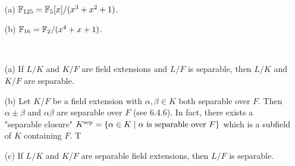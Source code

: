 \documentclass[11pt]{book}
\theoremstyle{definition}   \newtheorem{defn}[counter]{Definition} %
\newcommand{\vs}{\vspace{8pt}}   \newcommand{\hs}{\hspace{8pt}}
\numberwithin{counter}{chapter}
\begin{document}
\vs

\begin{example}\ 
\begin{enumerate}
\item[(a)] $\mathbb{F}_{125} = \mathbb{F}_5[x]/(x^3+x^2+1)$. 
\item[(b)] $\mathbb{F}_{16} = \mathbb{F}_2/(x^4+x+1)$. 
\end{enumerate}
\end{example}

\vs

\begin{remark}\ 
\begin{enumerate}
\item[(a)] If $L/K$ and $K/F$ are field extensions and $L/F$ is separable, then $L/K$ and $K/F$ are separable. 
\item[(b)] Let $K/F$ be a field extension with $\alpha, \beta \in K$ both separable over $F$. Then $\alpha \pm \beta$ and $ \alpha \beta$ are separable over $F$ (see 6.4.6). In fact, there exists a "separable closure" $K^{\textnormal{sep}} = \{\alpha \in K \mid \alpha \textnormal{ is separable over } F\}$ which is a subfield of $K$ containing $F$.
T %

\item[(c)] If $L/K$ and $K/F$ are separable field extensions, then $L/F$ is separable. 
\end{enumerate}
\end{remark}
\end{document}
